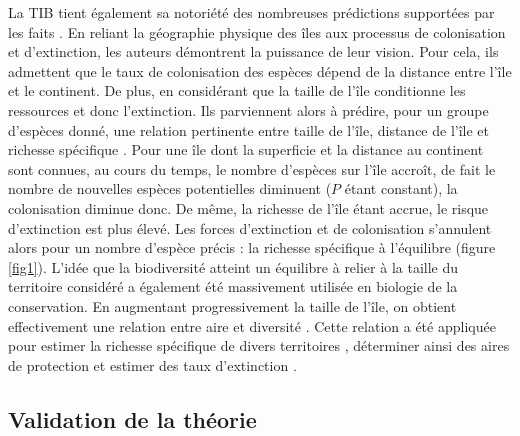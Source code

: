 La TIB tient également sa notoriété des nombreuses prédictions
supportées par les faits \cite{MacArthur1967}. En reliant la géographie
physique des îles aux processus de colonisation et d'extinction, les
auteurs démontrent la puissance de leur vision. Pour cela, ils admettent
que le taux de colonisation des espèces dépend de la distance entre
l'île et le continent. De plus, en considérant que la taille de l'île
conditionne les ressources et donc l'extinction. Ils parviennent alors à
prédire, pour un groupe d'espèces donné, une relation pertinente entre
taille de l'île, distance de l'île et richesse spécifique
\cite{MacArthur1967}. Pour une île dont la superficie et la distance au
continent sont connues, au cours du temps, le nombre d'espèces sur l'île
accroît, de fait le nombre de nouvelles espèces potentielles diminuent
(\(P\) étant constant), la colonisation diminue donc. De même, la
richesse de l'île étant accrue, le risque d'extinction est plus élevé.
Les forces d'extinction et de colonisation s'annulent alors pour un
nombre d'espèce précis : la richesse spécifique à l'équilibre (figure
\ref{fig1}). L'idée que la biodiversité atteint un équilibre à relier à
la taille du territoire considéré a également été massivement utilisée
en biologie de la conservation. En augmentant progressivement la taille
de l'île, on obtient effectivement une relation entre aire et diversité
\cite{MacArthur1967, Lomolino2000a}. Cette relation a été appliquée pour
estimer la richesse spécifique de divers territoires \cite{May1988},
déterminer ainsi des aires de protection \cite{Neigel2003,Desmet2004} et
estimer des taux d'extinction \cite{He2011}.

\subsection*{Validation de la
théorie}\label{validation-de-la-thuxe9orie}


